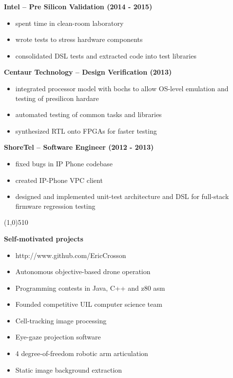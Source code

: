 \documentclass{report}
\newcommand{\cut}{\begin{center} \line(1,0){510} \end{center}}
\begin{document}
  \textbf{Intel -- Pre Silicon Validation (2014 - 2015)}
  \begin{itemize}[label=$\circ$]
    \item spent time in clean-room laboratory
    \item wrote tests to stress hardware components
    \item consolidated DSL tests and extracted code into test libraries
  \end{itemize}

  \textbf{Centaur Technology -- Design Verification (2013)}
  \begin{itemize}[label=$\circ$]
    \item integrated processor model with bochs to allow OS-level emulation and testing of presilicon hardare
    \item automated testing of common tasks and libraries
    \item synthesized RTL onto FPGAs for faster testing
  \end{itemize}

  \textbf{ShoreTel -- Software Engineer (2012 - 2013)}
  \begin{itemize}[label=$\circ$]
    \item fixed bugs in IP Phone codebase
    \item created IP-Phone VPC client
    \item designed and implemented unit-test architecture and DSL for full-stack firmware regression testing
  \end{itemize}
\cut{}

\textbf{Self-motivated projects}
\begin{paracol}{2}

  \begin{itemize}[label=$\circ$]
  \item http://www.github.com/EricCrosson
  \item Autonomous objective-based drone operation
  \item Programming contests in Java, C++ and z80 asm
  \item Founded competitive UIL computer science team
  \end{itemize}

  \switchcolumn{}
  \begin{itemize}[label=$\circ$]
  \item Cell-tracking image processing
  \item Eye-gaze projection software
  \item 4 degree-of-freedom robotic arm articulation
  \item Static image background extraction
  \end{itemize}
\end{paracol}
\end{document}

